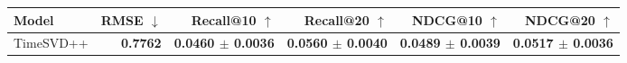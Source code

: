 \begin{tabular}{lrrrrr}
\toprule
Model & RMSE $\downarrow$ & Recall@10 $\uparrow$ & Recall@20 $\uparrow$ & NDCG@10 $\uparrow$ & NDCG@20 $\uparrow$ \\
\midrule
TimeSVD++ & \textbf{0.7762} & \textbf{0.0460 $\pm$ 0.0036} & \textbf{0.0560 $\pm$ 0.0040} & \textbf{0.0489 $\pm$ 0.0039} & \textbf{0.0517 $\pm$ 0.0036} \\
\bottomrule
\end{tabular}
